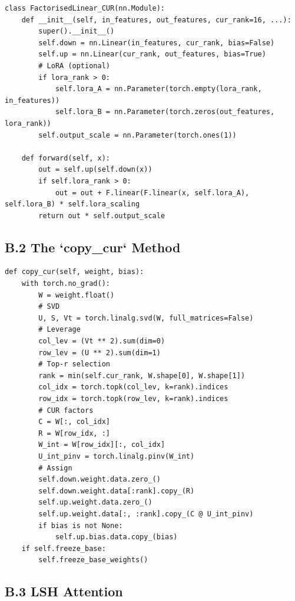 \begin{lstlisting}
class FactorisedLinear_CUR(nn.Module):
    def __init__(self, in_features, out_features, cur_rank=16, ...):
        super().__init__()
        self.down = nn.Linear(in_features, cur_rank, bias=False)
        self.up = nn.Linear(cur_rank, out_features, bias=True)
        # LoRA (optional)
        if lora_rank > 0:
            self.lora_A = nn.Parameter(torch.empty(lora_rank, in_features))
            self.lora_B = nn.Parameter(torch.zeros(out_features, lora_rank))
        self.output_scale = nn.Parameter(torch.ones(1))
    
    def forward(self, x):
        out = self.up(self.down(x))
        if self.lora_rank > 0:
            out = out + F.linear(F.linear(x, self.lora_A), self.lora_B) * self.lora_scaling
        return out * self.output_scale
\end{lstlisting}

\subsection{B.2 The `copy\_cur` Method}

\begin{lstlisting}
def copy_cur(self, weight, bias):
    with torch.no_grad():
        W = weight.float()
        # SVD
        U, S, Vt = torch.linalg.svd(W, full_matrices=False)
        # Leverage
        col_lev = (Vt ** 2).sum(dim=0)
        row_lev = (U ** 2).sum(dim=1)
        # Top-r selection
        rank = min(self.cur_rank, W.shape[0], W.shape[1])
        col_idx = torch.topk(col_lev, k=rank).indices
        row_idx = torch.topk(row_lev, k=rank).indices
        # CUR factors
        C = W[:, col_idx]
        R = W[row_idx, :]
        W_int = W[row_idx][:, col_idx]
        U_int_pinv = torch.linalg.pinv(W_int)
        # Assign
        self.down.weight.data.zero_()
        self.down.weight.data[:rank].copy_(R)
        self.up.weight.data.zero_()
        self.up.weight.data[:, :rank].copy_(C @ U_int_pinv)
        if bias is not None:
            self.up.bias.data.copy_(bias)
    if self.freeze_base:
        self.freeze_base_weights()
\end{lstlisting}

\subsection{B.3 LSH Attention}

